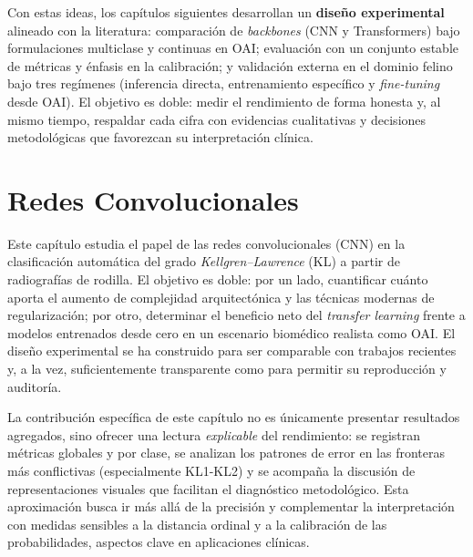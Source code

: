 \documentclass[11pt,spanish,listoffigures,listoftables]{tfgetsinf}
\begin{document}
Con estas ideas, los capítulos siguientes desarrollan un \textbf{diseño
	experimental} alineado con la literatura: comparación de \emph{backbones} (CNN
y Transformers) bajo formulaciones multiclase y continuas en OAI; evaluación
con un conjunto estable de métricas y énfasis en la calibración; y validación
externa en el dominio felino bajo tres regímenes (inferencia directa,
entrenamiento específico y \emph{fine-tuning} desde OAI). El objetivo es doble:
medir el rendimiento de forma honesta y, al mismo tiempo, respaldar cada cifra
con evidencias cualitativas y decisiones metodológicas que favorezcan su
interpretación clínica.


\chapter{Redes Convolucionales}
\label{chap:experiments}

Este capítulo estudia el papel de las redes convolucionales (CNN) en la
clasificación automática del grado \textit{Kellgren--Lawrence} (KL) a partir de
radiografías de rodilla. El objetivo es doble: por un lado, cuantificar cuánto
aporta el aumento de complejidad arquitectónica y las técnicas modernas de
regularización; por otro, determinar el beneficio neto del \textit{transfer
	learning} frente a modelos entrenados desde cero en un escenario biomédico
realista como OAI. El diseño experimental se ha construido para ser comparable
con trabajos recientes y, a la vez, suficientemente transparente como para
permitir su reproducción y auditoría.

La contribución específica de este capítulo no es únicamente presentar
resultados agregados, sino ofrecer una lectura \emph{explicable} del
rendimiento: se registran métricas globales y por clase, se analizan los
patrones de error en las fronteras más conflictivas (especialmente KL1-KL2) y
se acompaña la discusión de representaciones visuales que facilitan el
diagnóstico metodológico. Esta aproximación busca ir más allá de la
precisión y complementar la interpretación con medidas sensibles a la
distancia ordinal y a la calibración de las probabilidades, aspectos clave en
aplicaciones clínicas.
\end{document}
